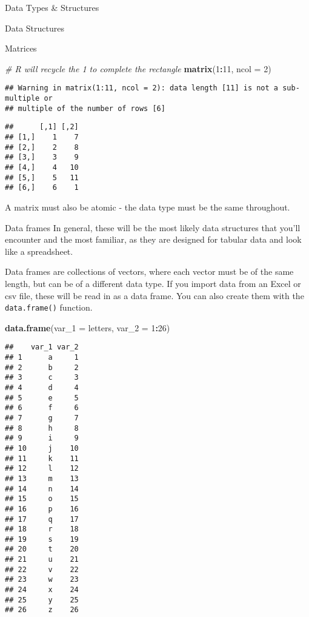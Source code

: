 \documentclass[
  ignorenonframetext,
]{beamer}
\newenvironment{Shaded}{\begin{snugshade}}{\end{snugshade}}
\newcommand{\AttributeTok}[1]{\textcolor[rgb]{0.13,0.29,0.53}{#1}}
\newcommand{\CommentTok}[1]{\textcolor[rgb]{0.56,0.35,0.01}{\textit{#1}}}
\newcommand{\DecValTok}[1]{\textcolor[rgb]{0.00,0.00,0.81}{#1}}
\newcommand{\FunctionTok}[1]{\textcolor[rgb]{0.13,0.29,0.53}{\textbf{#1}}}
\newcommand{\NormalTok}[1]{#1}
\newcommand{\SpecialCharTok}[1]{\textcolor[rgb]{0.81,0.36,0.00}{\textbf{#1}}}
\begin{document}
\begin{frame}[fragile]{Data Types \& Structures}
\begin{block}{Data Structures}
\begin{block}{Matrices}
\begin{Shaded}
\begin{Highlighting}[]
\CommentTok{\# R will recycle the 1 to complete the rectangle}
\FunctionTok{matrix}\NormalTok{(}\DecValTok{1}\SpecialCharTok{:}\DecValTok{11}\NormalTok{, }\AttributeTok{ncol =} \DecValTok{2}\NormalTok{)}
\end{Highlighting}
\end{Shaded}

\begin{verbatim}
## Warning in matrix(1:11, ncol = 2): data length [11] is not a sub-multiple or
## multiple of the number of rows [6]
\end{verbatim}

\begin{verbatim}
##      [,1] [,2]
## [1,]    1    7
## [2,]    2    8
## [3,]    3    9
## [4,]    4   10
## [5,]    5   11
## [6,]    6    1
\end{verbatim}

A matrix must also be atomic - the data type must be the same
throughout.
\end{block}

\begin{block}{Data frames}
\protect\hypertarget{data-frames}{}
In general, these will be the most likely data structures that you'll
encounter and the most familiar, as they are designed for tabular data
and look like a spreadsheet.

Data frames are collections of vectors, where each vector must be of the
same length, but can be of a different data type. If you import data
from an Excel or csv file, these will be read in as a data frame. You
can also create them with the \texttt{data.frame()} function.

\begin{Shaded}
\begin{Highlighting}[]
\FunctionTok{data.frame}\NormalTok{(}\AttributeTok{var\_1 =}\NormalTok{ letters,}
           \AttributeTok{var\_2 =} \DecValTok{1}\SpecialCharTok{:}\DecValTok{26}\NormalTok{)}
\end{Highlighting}
\end{Shaded}

\begin{verbatim}
##    var_1 var_2
## 1      a     1
## 2      b     2
## 3      c     3
## 4      d     4
## 5      e     5
## 6      f     6
## 7      g     7
## 8      h     8
## 9      i     9
## 10     j    10
## 11     k    11
## 12     l    12
## 13     m    13
## 14     n    14
## 15     o    15
## 16     p    16
## 17     q    17
## 18     r    18
## 19     s    19
## 20     t    20
## 21     u    21
## 22     v    22
## 23     w    23
## 24     x    24
## 25     y    25
## 26     z    26
\end{verbatim}
\end{block}


\end{block}
\end{frame}
\end{document}
